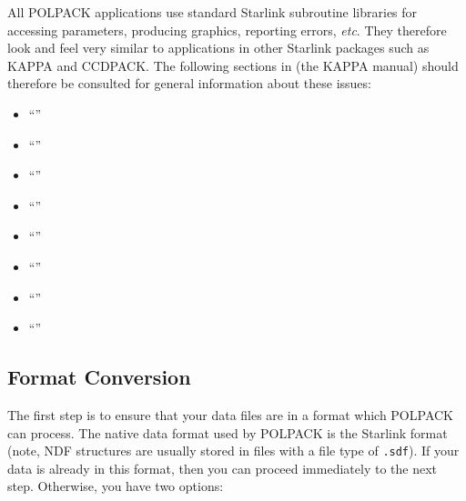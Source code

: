 \documentclass[twoside,11pt]{starlink}
\begin{document}
All POLPACK applications use standard Starlink subroutine libraries for
accessing parameters, producing graphics, reporting errors, \emph{etc}. They
therefore look and feel very similar to applications in other Starlink
packages such as KAPPA and CCDPACK. The following sections in
 (the KAPPA manual) should therefore be consulted for general
information about these issues:

\begin{itemize}
\item ``''
\item ``''
\item ``''
\item ``''
\item ``''
\item ``''
\item ``''
\item ``''
\end{itemize}

\subsection{\label{SEC:CONVERT}Format Conversion}

The first step is to ensure that your data files are in a format which
POLPACK can process. The native data format used by POLPACK is the
Starlink  format (note, NDF structures are usually
stored in files with a file type of \verb+.sdf+). If your data is already
in this format, then you can proceed immediately to the next step. Otherwise,
you have two options:
\end{document}
